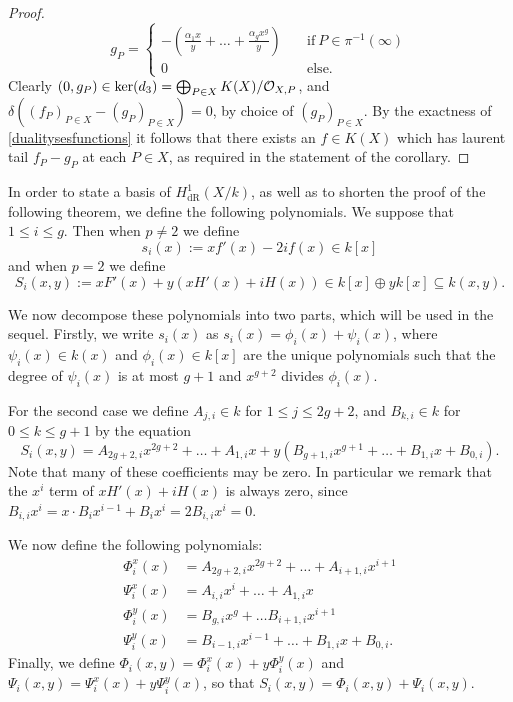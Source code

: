 \documentclass[11pt]{article} %
\theoremstyle{plain}
\theoremstyle{remark}
\newcommand{\cO}{{\cal O}}
\newcommand{\derhamhone}{H_{\text {dR}}^1(X/k)}
\begin{document}
\begin{proof}
\[
g_P = \begin{cases}
    - \left( \frac{\alpha_1 x}{y} + \ldots + \frac{\alpha_g x^g}{y}\right) & \quad \text{if}\ P \in \pi^{-1}(\infty) \\
    0 & \quad \text{else.}
\end{cases}
\]
Clearly $(0, g_P) \in \ker (d_3) = \bigoplus_{P \in X} K(X)/\cO_{X,P}$, and $\delta((f_P)_{P \in X} - (g_P)_{P \in X}) = 0$, by choice of $(g_P)_{P \in X}$.
By the exactness of \eqref{dualitysesfunctions} it follows that there exists an $f \in K(X)$ which has laurent tail $f_P - g_P$ at each $P \in X$, as required in the statement of the corollary.
\end{proof}


In order to state a basis of $\derhamhone$, as well as to shorten the proof of the following theorem, we define the following polynomials. 
We suppose that $1 \leq i \leq g$.
Then when $p\neq 2$ we define
\[
s_i(x) := xf'(x) - 2if(x) \in k[x]
\]
and when $p = 2$ we define
\begin{equation}\label{capitals}
S_i(x,y) := xF'(x) + y(xH'(x) + iH(x))\in k[x]\oplus yk[x] \subseteq k(x,y).
\end{equation}

We now decompose these polynomials into two parts, which will be used in the sequel.
Firstly, we write $s_i(x)$ as $s_i(x) = \phi_i(x) + \psi_i(x)$, where $\psi_i(x)\in k(x)$ and $\phi_i(x) \in k[x]$ are the unique polynomials such that the degree of $\psi_i (x)$ is at most $g+1$ and $x^{g+2}$ divides $\phi_i(x)$.

For the second case we define $A_{j,i} \in k$ for $1 \leq j \leq 2g+2$, and $B_{k,i} \in k$ for $0\leq k \leq g+1$ by the equation
\[
S_i(x,y) = A_{2g+2,i}x^{2g+2} + \ldots + A_{1,i} x + y(B_{g+1,i} x^{g+1} + \ldots + B_{1,i} x + B_{0,i}).
\]
Note that many of these coefficients may be zero.
In particular we remark that the $x^i$ term of $xH'(x) + iH(x)$ is always zero, since $B_{i,i}x^i = x \cdot B_ix^{i-1} + B_i x^i = 2B_{i,i}x^i = 0$.


We now define the following polynomials:
\begin{equation}\label{Split}
\begin{split}
\Phi_i^x(x) & =  A_{2g+2, i}x^{2g+2} + \ldots + A_{i+1, i}x^{i+1} \\
\Psi_i^x(x) & =  A_{i,i}x^i + \ldots + A_{1,i}x \\
\Phi_i^y(x) & =  B_{g,i}x^g + \ldots B_{i+1,i}x^{i+1} \\
\Psi_i^y(x) & =  B_{i-1,i}x^{i-1} + \ldots + B_{1,i}x + B_{0,i}.
\end{split}
\end{equation}
Finally, we define $\Phi_i(x,y) = \Phi_i^x(x) + y \Phi^y_i(x)$ and $\Psi_i(x,y) = \Psi_i^x(x) + y \Psi_i^y(x)$, so that $S_i(x,y) = \Phi_i(x,y) + \Psi_i(x,y)$.
\end{document}
